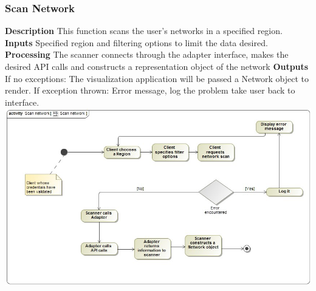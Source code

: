 \documentclass[hidelinks,a4paper,12pt]{article}
\begin{document}
	\subsubsection{Scan Network}
	\textbf{Description}
	\newline
	This function scans the user’s networks in a specified region.
	\textbf{Inputs}
	\newline
	Specified region and filtering options to limit the data desired.
	\newline
	\textbf{Processing}
	\newline
	The scanner connects through the adapter interface, makes the desired API calls and constructs a
	representation object of the network
	\newline
	\textbf{Outputs}
	\newline
	If no exceptions:
	\newline
	The visualization application will be passed a Network object to render.
	\newline
	If exception thrown:
	\newline
	Error message, log the problem take user back to interface.
	\newline
	\includegraphics[width=1.00\textwidth]{./images/Scan.png}\\[0.4cm] 
	\newpage	
\end{document}

